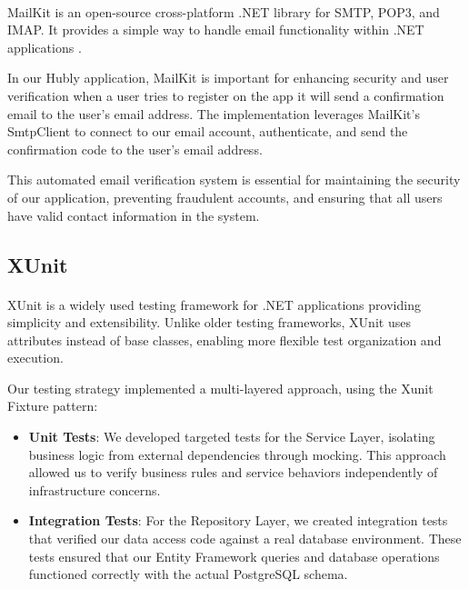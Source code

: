 \paragraph{}MailKit is an open-source cross-platform .NET library for SMTP, POP3, and IMAP. It provides a simple way to handle email functionality within .NET applications \cite{mailkit}.

In our Hubly application, MailKit is important for enhancing security and user verification when a user tries to register on the app it will send a confirmation email to the user's email address. The implementation leverages MailKit's SmtpClient to connect to our email account, authenticate, and send the confirmation code to the user's email address.

This automated email verification system is essential for maintaining the security of our application, preventing fraudulent accounts, and ensuring that all users have valid contact information in the system.

\subsection{XUnit}

\paragraph{}XUnit is a widely used testing framework for .NET applications\cite{xunit} providing simplicity and extensibility. Unlike older testing frameworks, XUnit uses attributes instead of base classes, enabling more flexible test organization and execution.

Our testing strategy implemented a multi-layered approach, using the Xunit Fixture pattern\cite{xunitFixture}:
\begin{itemize}
  \item \textbf{Unit Tests}: We developed targeted tests for the Service Layer, isolating business logic from external dependencies through mocking. This approach allowed us to verify business rules and service behaviors independently of infrastructure concerns.
  
  \item \textbf{Integration Tests}: For the Repository Layer, we created integration tests that verified our data access code against a real database environment. These tests ensured that our Entity Framework queries and database operations functioned correctly with the actual PostgreSQL schema.
\end{itemize}

